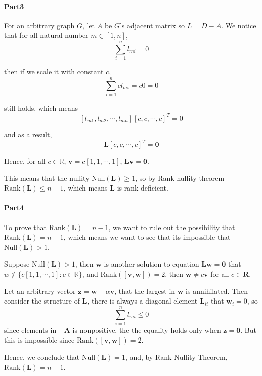 \documentclass[11pt]{article}
\begin{document}
	\paragraph{Part3}
		For an arbitrary graph $G$, let $A$ be $G$'s adjacent matrix so $L = D - A$. We notice that for all natural number $m \in [1, n]$, 
			\[\sum_{i = 1}^n l_{mi} = 0\]
			
			then if we scale it with constant $c$, 
			\[\sum_{i = 1}^n cl_{mi} = c0 =0\]
			
			still holds, which means 
			\[[l_{m1}, l_{m2}, \cdots, l_{mn}][c, c, \cdots, c]^T = 0\]
			
			and as a result, 
			\[\mathbf{L}[c, c, \cdots, c]^T = \mathbf{0}\]
			
			Hence, for all $c \in \mathbb{R}$, $\mathbf{v} = c[1, 1, \cdots, 1]$, $\mathbf{Lv} = \mathbf{0}$.
			
			This means that the nullity $\text{Null}(\mathbf{L}) \geq 1$, so by Rank-nullity theorem $\text{Rank}(\mathbf{L}) \leq n - 1$, which means $\mathbf{L}$ is rank-deficient.
	\paragraph{Part4}
		To prove that $\text{Rank}(\mathbf{L}) = n - 1$, we want to rule out the possibility that $\text{Rank}(\mathbf{L}) = n - 1$, which means we want to see that its impossible that $\text{Null}(\mathbf{L}) > 1$.
		
		Suppose $\text{Null}(\mathbf{L}) > 1$, then $\mathbf{w}$ is another solution to equation $\mathbf{Lw = 0}$ that $w \notin \{c[1, 1, \cdots, 1] : c \in \mathbb{R}\}$, and $\text{Rank}([\mathbf{v, w}]) = 2$, then $\mathbf{w} \neq c\mathbf{v}$ for all $c \in \mathbf{R}$.
		
		Let an arbitrary vector $\mathbf{z} = \mathbf{w} - \alpha\mathbf{v}$, that the largest in $\mathbf{w}$ is annihilated. Then consider the structure of $\mathbf{L}$, there is always a diagonal element $\mathbf{L}_{ii}$ that $\mathbf{w}_i = 0$, so
		\[\sum_{i = 1}^n l_{mi} \leq 0\]
		since elements in $-\mathbf{A}$ is nonpositive, the the equality holds only when $\mathbf{z = 0}$. But this is impossible since $\text{Rank}([\mathbf{v, w}]) = 2$.
		
		Hence, we conclude that $\text{Null}(\mathbf{L}) = 1$, and, by Rank-Nullity Theorem, $\text{Rank}(\mathbf{L}) = n - 1$.
\end{document}
